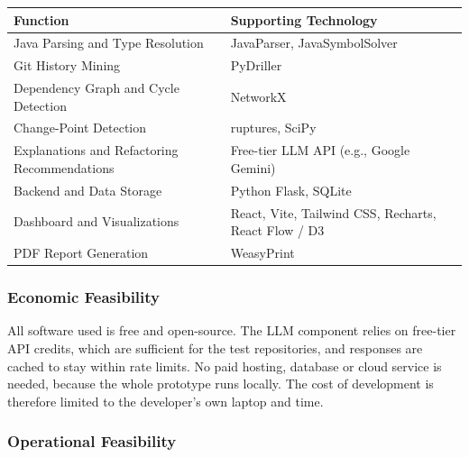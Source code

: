 \documentclass[12pt,a4paper]{article}
\begin{document}
\begin{table}[htbp]
\centering
\label{tab:techfeas}
\renewcommand{\arraystretch}{1.5}
\setlength{\tabcolsep}{6pt}

\begin{tabular}{|L{1.9in}|L{3.45in}|}
\hline
\textbf{Function} & \textbf{Supporting Technology} \\
\hline
Java Parsing and Type Resolution
    & JavaParser, JavaSymbolSolver \\
\hline
Git History Mining
    & PyDriller \\
\hline
Dependency Graph and Cycle Detection
    & NetworkX \\
\hline
Change-Point Detection
    & ruptures, SciPy \\
\hline
Explanations and Refactoring Recommendations
    & Free-tier LLM API (e.g., Google Gemini) \\
\hline
Backend and Data Storage
    & Python Flask, SQLite \\
\hline
Dashboard and Visualizations
    & React, Vite, Tailwind CSS, Recharts, React Flow / D3 \\
\hline
PDF Report Generation
    & WeasyPrint \\
\hline
\end{tabular}
\end{table}

\subsubsection{Economic Feasibility}

\begin{spacing}{1.5}
\justifying
All software used is free and open-source. The LLM component relies on
free-tier API credits, which are sufficient for the test repositories,
and responses are cached to stay within rate limits. No paid hosting,
database or cloud service is needed, because the whole prototype runs
locally. The cost of development is therefore limited to the developer's
own laptop and time.
\end{spacing}

\subsubsection{Operational Feasibility}
\end{document}
